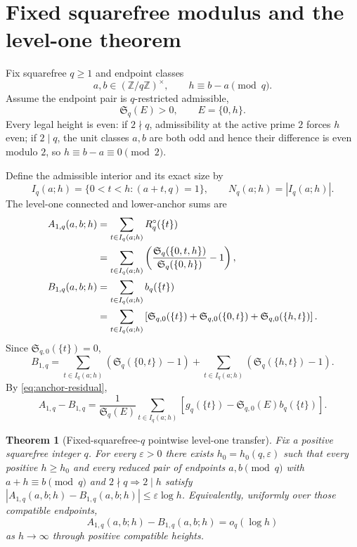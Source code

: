 \documentclass[11pt]{article}
\newtheorem{theorem}{Theorem}[section]
\theoremstyle{definition}
\theoremstyle{remark}
\newcommand{\SSer}{\mathfrak S}
\newcommand{\1}{\mathbf 1}
\newcommand{\Zmod}{\mathbb Z}
\begin{document}
\section{Fixed squarefree modulus and the level-one theorem}\label{sec:fixed-q-setup}

Fix squarefree $q\ge1$ and endpoint classes
\[
a,b\in(\Zmod/q\Zmod)^\times,
\qquad h\equiv b-a\pmod q.
\]
Assume the endpoint pair is $q$-restricted admissible,
\[
\SSer_q(E)>0,
\qquad E=\{0,h\}.
\]
Every legal height is even: if $2\nmid q$, admissibility at the active prime $2$ forces $h$ even; if $2\mid q$, the unit classes $a,b$ are both odd and hence their difference is even modulo $2$, so $h\equiv b-a\equiv0\pmod2$.

Define the admissible interior and its exact size by
\begin{equation}\label{eq:IqNq}
I_q(a;h)=\{0<t<h:(a+t,q)=1\},
\qquad N_q(a;h)=|I_q(a;h)|.
\end{equation}
The level-one connected and lower-anchor sums are
\begin{align}
A_{1,q}(a,b;h)
&=\sum_{t\in I_q(a;h)}R_q^\circ(\{t\})\notag\\
&=\sum_{t\in I_q(a;h)}
\left(
\frac{\SSer_q(\{0,t,h\})}{\SSer_q(\{0,h\})}-1
\right),\label{eq:A1q}\\
B_{1,q}(a,b;h)
&=\sum_{t\in I_q(a;h)}b_q(\{t\})\notag\\
&=\sum_{t\in I_q(a;h)}
\left[\SSer_{q,0}(\{t\})
+\SSer_{q,0}(\{0,t\})
+\SSer_{q,0}(\{h,t\})\right].\label{eq:B1q}
\end{align}
Since $\SSer_{q,0}(\{t\})=0$,
\begin{equation}\label{eq:B1q-simple}
B_{1,q}
=\sum_{t\in I_q(a;h)}(\SSer_q(\{0,t\})-1)
+\sum_{t\in I_q(a;h)}(\SSer_q(\{h,t\})-1).
\end{equation}
By \eqref{eq:anchor-residual},
\begin{equation}\label{eq:AminusB-connected}
A_{1,q}-B_{1,q}
=\frac1{\SSer_q(E)}
\sum_{t\in I_q(a;h)}
\left[g_q(\{t\})-\SSer_{q,0}(E)b_q(\{t\})\right].
\end{equation}

\begin{theorem}[Fixed-squarefree-$q$ pointwise level-one transfer]\label{thm:fixed-q}
Fix a positive squarefree integer $q$. For every $\varepsilon>0$
there exists $h_0=h_0(q,\varepsilon)$ such that every positive
$h\ge h_0$ and every reduced pair of endpoints $a,b\pmod q$
with $a+h\equiv b\pmod q$ and
$2\nmid q\Rightarrow 2\mid h$ satisfy
$|A_{1,q}(a,b;h)-B_{1,q}(a,b;h)|\le\varepsilon\log h$.
Equivalently, uniformly over those compatible endpoints,
\begin{equation}\label{eq:main-theorem}
\boxed{A_{1,q}(a,b;h)-B_{1,q}(a,b;h)=o_q(\log h)}
\end{equation}
as $h\to\infty$ through positive compatible heights.
\end{theorem}
\end{document}
